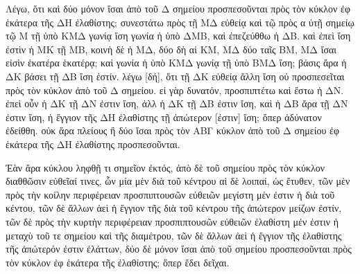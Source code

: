 \begin{Parallel}{}{}
{\epsfysize=2.5in
\centerline{}

{\greekfont Λέγω, ὅτι καὶ δύο μόνον ἴσαι ἀπὸ τοῦ Δ σημείου προσπεσοῦνται
πρὸς τὸν κύκλον ἐφ ἑκάτερα τῆς ΔΗ ἐλαθίστης; συνεστάτω πρὸς
τῇ ΜΔ εὐθείᾳ καὶ τῷ πρὸς α ὐτῇ σημείῳ τῷ Μ τῇ ὑπὸ ΚΜΔ γωνίᾳ ἴση γωνία ἡ ὑπὸ ΔΜΒ, καὶ ἐπεζεύθθω ἡ ΔΒ. καὶ ἐπεὶ ἴση ἐστὶν ἡ ΜΚ τῇ ΜΒ, κοινὴ δὲ ἡ ΜΔ, δύο δὴ αἱ ΚΜ, ΜΔ
δύο ταῖς ΒΜ, ΜΔ ἴσαι εἰσὶν ἑκατέρα ἑκατέρᾳ; καὶ γωνία ἡ
ὑπὸ ΚΜΔ γωνίᾳ τῇ ὑπὸ ΒΜΔ ἴση; βάσις  ἄρα ἡ ΔΚ βάσει
τῇ ΔΒ ἴση ἐστίν. λέγω [δή], ὅτι τῇ ΔΚ εὐθείᾳ ἄλλη ἴση
οὐ προσπεσεῖται πρὸς τὸν κύκλον ἀπὸ τοῦ Δ σημείου. εἰ γὰρ
δυνατόν, προσπιπτέτω καὶ ἔστω ἡ ΔΝ. ἐπεὶ οὖν ἡ ΔΚ
τῇ ΔΝ ἐστιν ἴση, ἀλλ ἡ ΔΚ τῇ ΔΒ ἐστιν ἴση, καὶ
ἡ ΔΒ ἄρα τῇ ΔΝ ἐστιν ἴση, ἡ ἔγγιον τῆς ΔΗ ἐλαθίστης τῇ
ἀπώτερον [ἐστιν] ἴση; ὅπερ ἀδύνατον ἐδείθθη. οὐκ
ἄρα πλείους ἢ δύο ἴσαι πρὸς τὸν ΑΒΓ κύκλον ἀπὸ τοῦ Δ σημείου
ἐφ ἑκάτερα τῆς ΔΗ ἐλαθίστης προσπεσοῦνται.}

{\greekfont Ἐὰν ἄρα κύκλου ληφθῇ τι σημεῖον ἐκτός, ἀπὸ δὲ τοῦ σημείου πρὸς
τὸν κύκλον διαθθῶσιν εὐθεῖαί τινες, ὧν μία μὲν διὰ τοῦ κέντρου
αἱ δὲ λοιπαί, ὡς ἔτυθεν, τῶν μὲν πρὸς τὴν κοίλην περιφέρειαν προσπιπτουσῶν εὐθειῶν μεγίστη μέν ἐστιν ἡ διὰ τοῦ κέντου, τῶν δὲ ἄλλων ἀεὶ ἡ ἔγγιον τῆς διὰ τοῦ κέντρου τῆς ἀπώτερον μείζων ἐστίν, τῶν δὲ πρὸς τὴν κυρτὴν περιφέρειαν προσπιπτουσῶν εὐθειῶν
ἐλαθίστη μέν ἐστιν ἡ μεταχὺ τοῦ τε σημείου καὶ τῆς διαμέτρου, τῶν δὲ ἄλλων ἀεὶ ἡ ἔγγιον τῆς ἐλαθίστης τῆς ἀπώτερόν ἐστιν
ἐλάττων, δύο δὲ μόνον ἴσαι ἀπὸ τοῦ σημείου προσπεσοῦνται
πρὸς τὸν κύκλον ἐφ ἑκάτερα τῆς ἐλαθίστης; ὅπερ ἔδει δεῖχαι.}}

\end{Parallel}
